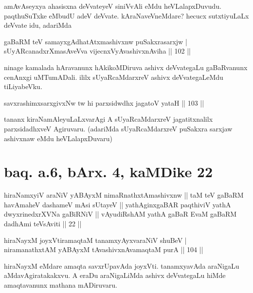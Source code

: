 \begin{artha}
amAvAseyxya ahasisxna deVvateyeV siniVvAli eMdu heVLalapxDuvudu. 
paqthuSuTxke eMbudU adeV deVvate. kAraNaveVneMdare? hecucx 
sutxtiyuLaLx deVvate idu, adariMda
\end{artha}

\begin{shl}
gaBaRM teV samayxgAdhatAtxmashivxnw puSakxrasarxjw | \\
sUyARcanadxrXmasAveVva vijecnxVyAvashivxnAviha \hfill|| 102 || 
\end{shl}

\begin{artha}
ninage kamalada hAravanunx hAkikoMDiruva ashivx deVvategaLu 
gaBaRvanunx cenAnxgi uMTumADali. ililx sUyaRcaMdarxreV ashivx 
deVvategaLeMdu tiLiyabeVku.
\end{artha}


\begin{shl}
savxrashimxsarxgivxNw tw hi parxsidwdhx jagatoV yataH \hfill|| 103 || \\
\end{shl}

\begin{artha}
tananx kiraNamAleyuLaLxvarAgi A sUyaRcaMdarxreV jagatitxnalilx 
parxsidadhxveV Agiruvaru. (adariMda sUyaRcaMdarxreV puSakxra sarxjaw 
ashivxnaw eMdu heVLalapxDuvaru)
\end{artha}

\section*{baq. a.6, bArx. 4, kaMDike 22}

\begin{shl}
hiraNamxyiV araNiV yABAyxM nimaRnathxtAmashivxnw || taM teV gaBaRM havAmaheV dashameV mAsi sUtayeV || yathAginxgaBAR paqthiviV yathA dwyxrinedxrXVNa gaBiRNiV || vAyudiRshAM yathA gaBaR EvaM gaBaRM dadhAmi teV\s sAviti || 22 ||
\end{shl}
 

\begin{shl}
hiraNayxM joyxVtiramaqtaM tanamxyAyxvaraNiV shuBeV | \\
niramanathxtAM yABAyxM tAvashivxnAvamaqtaM purA \hfill|| 104 || 
\end{shl}

\begin{artha}
hiraNayxM eMdare amaqta savxrUpavAda joyxVti. tanamxyavAda araNigaLu 
aMdavAgiratakakxvu. A eraDu araNigaLiMda ashivx deVvategaLu hiMde 
amaqtavanunx mathana mADiruvaru.
\end{artha}

